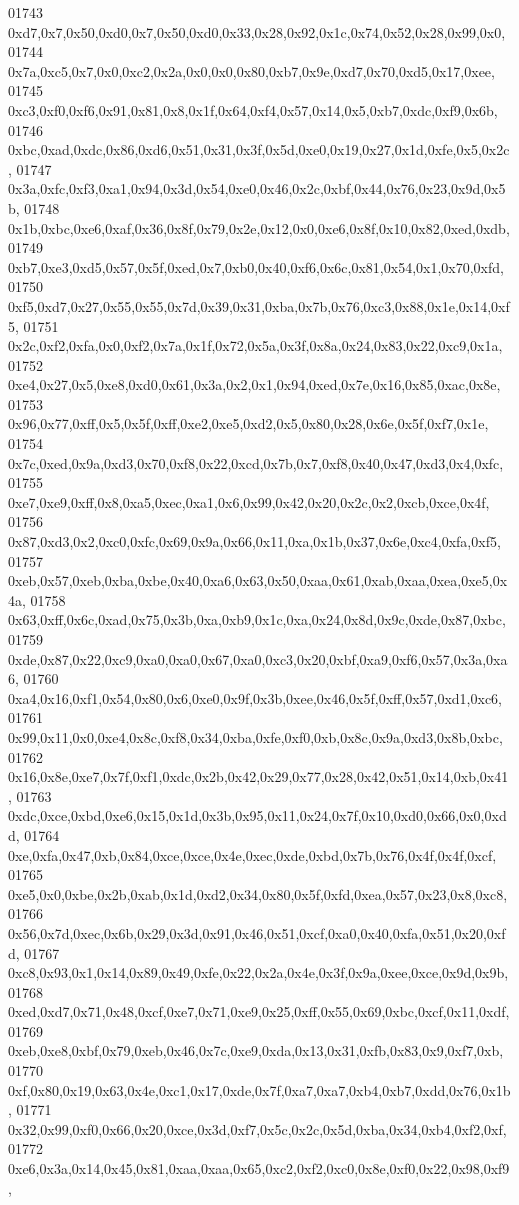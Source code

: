 \begin{DoxyCode}
01743   0xd7,0x7,0x50,0xd0,0x7,0x50,0xd0,0x33,0x28,0x92,0x1c,0x74,0x52,0x28,0x99,0x0,
01744   0x7a,0xc5,0x7,0x0,0xc2,0x2a,0x0,0x0,0x80,0xb7,0x9e,0xd7,0x70,0xd5,0x17,0xee,
01745   0xc3,0xf0,0xf6,0x91,0x81,0x8,0x1f,0x64,0xf4,0x57,0x14,0x5,0xb7,0xdc,0xf9,0x6b,
01746   0xbc,0xad,0xdc,0x86,0xd6,0x51,0x31,0x3f,0x5d,0xe0,0x19,0x27,0x1d,0xfe,0x5,0x2c,
01747   0x3a,0xfc,0xf3,0xa1,0x94,0x3d,0x54,0xe0,0x46,0x2c,0xbf,0x44,0x76,0x23,0x9d,0x5b,
01748   0x1b,0xbc,0xe6,0xaf,0x36,0x8f,0x79,0x2e,0x12,0x0,0xe6,0x8f,0x10,0x82,0xed,0xdb,
01749   0xb7,0xe3,0xd5,0x57,0x5f,0xed,0x7,0xb0,0x40,0xf6,0x6c,0x81,0x54,0x1,0x70,0xfd,
01750   0xf5,0xd7,0x27,0x55,0x55,0x7d,0x39,0x31,0xba,0x7b,0x76,0xc3,0x88,0x1e,0x14,0xf5,
01751   0x2c,0xf2,0xfa,0x0,0xf2,0x7a,0x1f,0x72,0x5a,0x3f,0x8a,0x24,0x83,0x22,0xc9,0x1a,
01752   0xe4,0x27,0x5,0xe8,0xd0,0x61,0x3a,0x2,0x1,0x94,0xed,0x7e,0x16,0x85,0xac,0x8e,
01753   0x96,0x77,0xff,0x5,0x5f,0xff,0xe2,0xe5,0xd2,0x5,0x80,0x28,0x6e,0x5f,0xf7,0x1e,
01754   0x7c,0xed,0x9a,0xd3,0x70,0xf8,0x22,0xcd,0x7b,0x7,0xf8,0x40,0x47,0xd3,0x4,0xfc,
01755   0xe7,0xe9,0xff,0x8,0xa5,0xec,0xa1,0x6,0x99,0x42,0x20,0x2c,0x2,0xcb,0xce,0x4f,
01756   0x87,0xd3,0x2,0xc0,0xfc,0x69,0x9a,0x66,0x11,0xa,0x1b,0x37,0x6e,0xc4,0xfa,0xf5,
01757   0xeb,0x57,0xeb,0xba,0xbe,0x40,0xa6,0x63,0x50,0xaa,0x61,0xab,0xaa,0xea,0xe5,0x4a,
01758   0x63,0xff,0x6c,0xad,0x75,0x3b,0xa,0xb9,0x1c,0xa,0x24,0x8d,0x9c,0xde,0x87,0xbc,
01759   0xde,0x87,0x22,0xc9,0xa0,0xa0,0x67,0xa0,0xc3,0x20,0xbf,0xa9,0xf6,0x57,0x3a,0xa6,
01760   0xa4,0x16,0xf1,0x54,0x80,0x6,0xe0,0x9f,0x3b,0xee,0x46,0x5f,0xff,0x57,0xd1,0xc6,
01761   0x99,0x11,0x0,0xe4,0x8c,0xf8,0x34,0xba,0xfe,0xf0,0xb,0x8c,0x9a,0xd3,0x8b,0xbc,
01762   0x16,0x8e,0xe7,0x7f,0xf1,0xdc,0x2b,0x42,0x29,0x77,0x28,0x42,0x51,0x14,0xb,0x41,
01763   0xdc,0xce,0xbd,0xe6,0x15,0x1d,0x3b,0x95,0x11,0x24,0x7f,0x10,0xd0,0x66,0x0,0xdd,
01764   0xe,0xfa,0x47,0xb,0x84,0xce,0xce,0x4e,0xec,0xde,0xbd,0x7b,0x76,0x4f,0x4f,0xcf,
01765   0xe5,0x0,0xbe,0x2b,0xab,0x1d,0xd2,0x34,0x80,0x5f,0xfd,0xea,0x57,0x23,0x8,0xc8,
01766   0x56,0x7d,0xec,0x6b,0x29,0x3d,0x91,0x46,0x51,0xcf,0xa0,0x40,0xfa,0x51,0x20,0xfd,
01767   0xc8,0x93,0x1,0x14,0x89,0x49,0xfe,0x22,0x2a,0x4e,0x3f,0x9a,0xee,0xce,0x9d,0x9b,
01768   0xed,0xd7,0x71,0x48,0xcf,0xe7,0x71,0xe9,0x25,0xff,0x55,0x69,0xbc,0xcf,0x11,0xdf,
01769   0xeb,0xe8,0xbf,0x79,0xeb,0x46,0x7c,0xe9,0xda,0x13,0x31,0xfb,0x83,0x9,0xf7,0xb,
01770   0xf,0x80,0x19,0x63,0x4e,0xc1,0x17,0xde,0x7f,0xa7,0xa7,0xb4,0xb7,0xdd,0x76,0x1b,
01771   0x32,0x99,0xf0,0x66,0x20,0xce,0x3d,0xf7,0x5c,0x2c,0x5d,0xba,0x34,0xb4,0xf2,0xf,
01772   0xe6,0x3a,0x14,0x45,0x81,0xaa,0xaa,0x65,0xc2,0xf2,0xc0,0x8e,0xf0,0x22,0x98,0xf9,

\end{DoxyCode}
